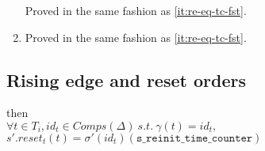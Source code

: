 \documentclass[dvipsnames,12pt]{article}
\begin{document}
\begin{niproof}
\begin{enumerate}
    \noindent{}Proved in the same fashion as \ref{it:re-eq-tc-fst}.
    
  \item
    
    \noindent{}Proved in the same fashion as \ref{it:re-eq-tc-fst}.
  \end{enumerate}
  
\end{niproof}

\subsection{Rising edge and reset orders}
\label{sec:re-reset-orders}

\begin{lemma}
  \label{lem:re-equal-reset-orders}
  \rehyps{} then\\
  $\forall{}t\in{}T_i,id_t\in{}Comps(\Delta)~s.t.~\gamma(t)=id_t,$
  $s'.reset_t(t)=\sigma'(id_t)(\texttt{s\_reinit\_time\_counter})$
\end{lemma}
\end{document}
